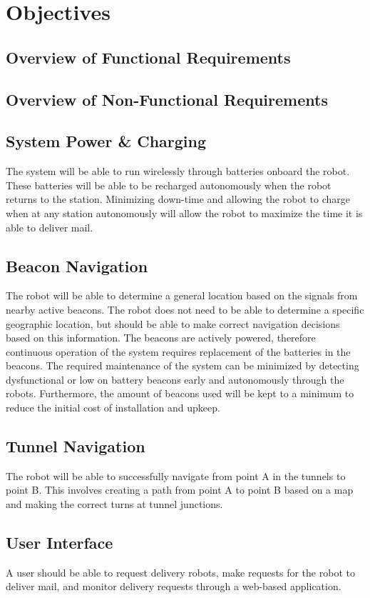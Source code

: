 \documentclass[12pt]{report}
\begin{document}
\section{Objectives}
\subsection{Overview of Functional Requirements}
\subsection{Overview of Non-Functional Requirements}

\subsection{System Power \& Charging}
 The system will be able to run wirelessly through batteries onboard the robot. These batteries will be able to be recharged autonomously when the robot returns to the station. Minimizing down-time and allowing the robot to charge when at any station autonomously will allow the robot to maximize the time it is able to deliver mail.
\subsection{Beacon Navigation}
The robot will be able to determine a general location based on the signals from nearby active beacons. The robot does not need to be able to determine a specific geographic location, but should be able to make correct navigation decisions based on this information. The beacons are actively powered, therefore continuous operation of the system requires replacement of the batteries in the beacons. The required maintenance of the system can be minimized by detecting dysfunctional or low on battery beacons early and autonomously through the robots. Furthermore, the amount of beacons used will be kept to a minimum to reduce the initial cost of installation and upkeep.
\subsection{Tunnel Navigation}
The robot will be able to successfully navigate from point A in the tunnels to point B. This involves creating a path from point A to point B based on a map and making the correct turns at tunnel junctions.
\subsection{User Interface}
 A user should be able to request delivery robots, make requests for the robot to deliver mail, and monitor delivery requests through a web-based application.
\end{document}
